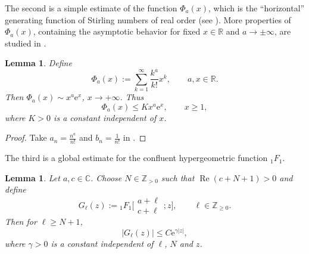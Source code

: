 \documentclass[11pt]{article}
\numberwithin{equation}{section}
\numberwithin{equation}{section}
\newtheorem{Lemma}[Theorem]{Lemma}
\newcommand{\CC}{\ensuremath{\mathbb{C}}}
\newcommand{\RR}{\ensuremath{\mathbb{R}}}
\newcommand{\ZZ}{\ensuremath{\mathbb{Z}}}
\newcommand{\me}{\mathrm{e}}
\begin{document}
The second is a simple estimate of the function $\Phi_a(x)$, which is the ``horizontal'' generating function of Stirling numbers of real order (see \cite[Section~8]{Butzer_Kilbas_Trujillo-2003}). More properties of $\Phi_a(x)$, containing the asymptotic behavior for fixed $x\in\RR$ and $a\to\pm\infty$, are studied in \cite[Section~3.2]{VanGorder-2009}.
\begin{Lemma}\label{Phi_a(x) estimate}
	Define
	\[\Phi_a(x):=\sum_{k=1}^{\infty}\frac{k^a}{k!}x^k,\qquad a,x\in\RR.\]
	Then $\Phi_a(x)\sim x^a\me^x$, $x\to +\infty$. Thus
	\[\Phi_a(x)\leqslant Kx^a\me^x,\qquad x\geqslant 1,\]
	where $K>0$ is a constant independent of $x$.
\end{Lemma}
\begin{proof}
	Take $a_n=\frac{n^a}{n!}$ and $b_n=\frac{1}{n!}$ in \cite[p.~12, Problem~72]{Polya_Szego-vol.2}.
\end{proof}

The third is a global estimate for the confluent hypergeometric function $_1F_1$.

\begin{Lemma}\label{lem-1F1}
	Let $a,c\in\CC$. Choose $N\in\ZZ_{>0}$ such that $\operatorname{Re}(c+N+1)>0$ and define
	\begin{equation}\label{G_l definition}
			G_{\ell}(z):={}_1F_1\bigg[\begin{matrix}
				a+\ell\\
				c+\ell
			\end{matrix};z\bigg],\qquad \ell\in\ZZ_{\geqslant 0}.
	\end{equation}
	Then for $\ell\geqslant N+1$,
 \begin{equation}\label{G_l inequality}
			|G_\ell(z)|\leqslant C\me^{\gamma|z|},
	\end{equation}
	where $\gamma>0$ is a constant independent of $\ell$, $N$ and $z$.
\end{Lemma}
\end{document}
